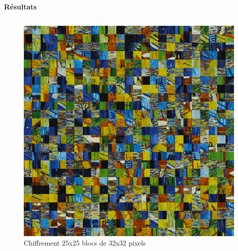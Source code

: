 \documentclass{beamer}
\begin{document}
\begin{frame}[t]
\begin{columns}[t]
\begin{column}{.5\linewidth}
\begin{block}{\centering \textbf{Résultats}}
\begin{columns}[t]
                        \begin{column}{.25\linewidth}
                            \begin{figure}[t]
                                \includegraphics[width=\linewidth]{rsc/van_gogh_25_12.png}\\
                                {\small Chiffrement 25x25 blocs de 32x32 pixels}
                            \end{figure}
                        \end{column}


\end{columns}
\end{block}
\end{column}
\end{columns}
\end{frame}
\end{document}
